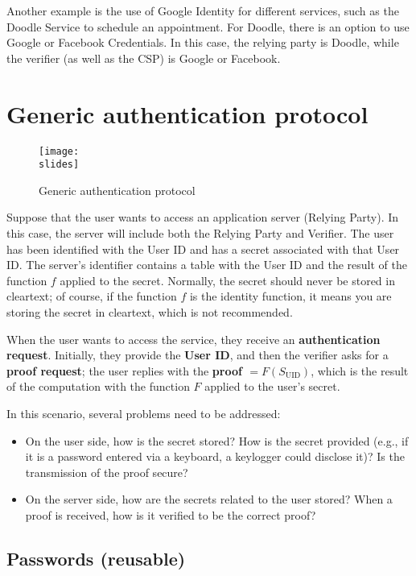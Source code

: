 Another example is the use of Google Identity for different services, such as the Doodle Service to schedule an
appointment. For Doodle, there is an option to use Google or Facebook Credentials. In this case, the relying party
is Doodle, while the verifier (as well as the CSP) is Google or Facebook.


\section{Generic authentication protocol}

\begin{figure}[h]
  \centering
  \texttt{[image: \\slides]}
  \caption{Generic authentication protocol}
\end{figure}
Suppose that the user wants to access an application server (Relying Party). In this case, the server will include both the Relying Party and Verifier.
The user has been identified with the User ID and has a secret associated with that User ID.
The server's identifier contains a table with the User ID and the result of the function $f$ applied to the secret. Normally, the secret should never be stored in cleartext; of course, if the function $f$ is the identity function, it means you are storing the secret in cleartext, which is not recommended.

When the user wants to access the service, they receive an \textbf{authentication request}. Initially, they provide the \textbf{User ID}, and then the verifier asks for a \textbf{proof request}; the user replies with the \textbf{proof $ = F(S_{\mathrm{UID}})$}, which is the result of the computation with the function $F$ applied to the user's secret.

In this scenario, several problems need to be addressed:
\begin{itemize}
  \item On the user side, how is the secret stored? How is the secret provided (e.g., if it is a password entered via a keyboard, a keylogger could disclose it)? Is the transmission of the proof secure?
  \item On the server side, how are the secrets related to the user stored? When a proof is received, how is it verified to be the correct proof?
\end{itemize}



\subsection{Passwords (reusable)}

